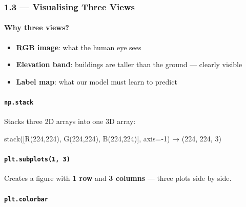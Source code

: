 \documentclass[11pt]{article}
\providecommand{\tightlist}{%
      \setlength{\itemsep}{0pt}\setlength{\parskip}{0pt}}
\newenvironment{Shaded}{}{}
\newcommand{\DecValTok}[1]{\textcolor[rgb]{0.25,0.63,0.44}{{#1}}}
\newcommand{\NormalTok}[1]{{#1}}
\newcommand{\OperatorTok}[1]{\textcolor[rgb]{0.40,0.40,0.40}{{#1}}}
\begin{document}
    \subsubsection{1.3 --- Visualising Three
Views}\label{visualising-three-views}

\paragraph{Why three views?}\label{why-three-views}

\begin{itemize}
\tightlist
\item
  \textbf{RGB image}: what the human eye sees
\item
  \textbf{Elevation band}: buildings are taller than the ground ---
  clearly visible
\item
  \textbf{Label map}: what our model must learn to predict
\end{itemize}

\paragraph{\texorpdfstring{\texttt{np.stack}}{np.stack}}\label{np.stack}

Stacks three 2D arrays into one 3D array:

\begin{Shaded}
\begin{Highlighting}[]
\NormalTok{stack([R(}\DecValTok{224}\NormalTok{,}\DecValTok{224}\NormalTok{), G(}\DecValTok{224}\NormalTok{,}\DecValTok{224}\NormalTok{), B(}\DecValTok{224}\NormalTok{,}\DecValTok{224}\NormalTok{)], axis}\OperatorTok{={-}}\DecValTok{1}\NormalTok{) → (}\DecValTok{224}\NormalTok{, }\DecValTok{224}\NormalTok{, }\DecValTok{3}\NormalTok{)}
\end{Highlighting}
\end{Shaded}

\paragraph{\texorpdfstring{\texttt{plt.subplots(1,\ 3)}}{plt.subplots(1, 3)}}\label{plt.subplots1-3}

Creates a figure with \textbf{1 row} and \textbf{3 columns} --- three
plots side by side.

\paragraph{\texorpdfstring{\texttt{plt.colorbar}}{plt.colorbar}}\label{plt.colorbar}
\end{document}
